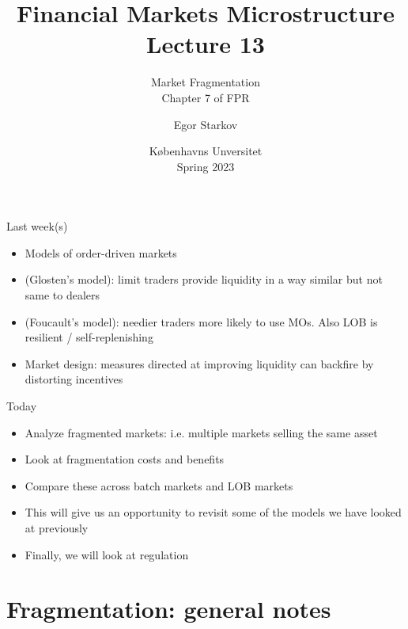 \documentclass[english,10pt
,aspectratio=169
]{beamer}
\title{Financial Markets Microstructure \\ Lecture 13}
\subtitle{Market Fragmentation\\
	Chapter 7 of FPR}
\author{Egor Starkov}
\date{K{\o}benhavns Unversitet \\
	Spring 2023}
\begin{document}
\frame[plain]{\titlepage}


\begin{frame}{Last week(s)}
	\begin{itemize}
		\item Models of order-driven markets
		\item (Glosten's model): limit traders provide liquidity in a way similar but not same to dealers
		\item (Foucault's model): needier traders more likely to use MOs. Also LOB is resilient / self-replenishing
		\item Market design: measures directed at improving liquidity can backfire by distorting incentives
	\end{itemize}
\end{frame}


\begin{frame}{Today}
	\begin{itemize}
		\item Analyze fragmented markets: i.e. multiple markets selling the same asset
		\item Look at fragmentation costs and benefits
		\item Compare these across batch markets and LOB markets
		\item This will give us an opportunity to revisit some of the models we have looked at previously
		\item Finally, we will look at regulation
	\end{itemize}
\end{frame}



\section{Fragmentation: general notes}
\end{document}
